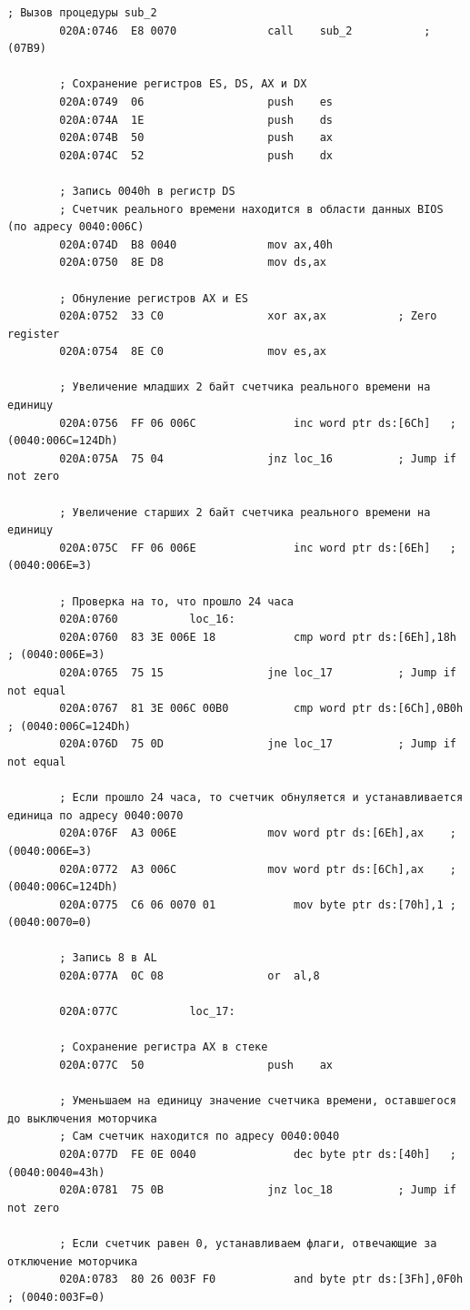 \documentclass[14pt, a4paper]{article}
\begin{document}
	\begin{lstlisting}[style={asm}]
		; Вызов процедуры sub_2
		020A:0746  E8 0070				call	sub_2			; (07B9)
		
		; Сохранение регистров ES, DS, AX и DX
		020A:0749  06					push	es
		020A:074A  1E					push	ds
		020A:074B  50					push	ax
		020A:074C  52					push	dx
		
		; Запись 0040h в регистр DS
		; Cчетчик реального времени находится в области данных BIOS (по адресу 0040:006C)
		020A:074D  B8 0040				mov	ax,40h
		020A:0750  8E D8				mov	ds,ax
		
		; Обнуление регистров AX и ES
		020A:0752  33 C0				xor	ax,ax			; Zero register
		020A:0754  8E C0				mov	es,ax
		
		; Увеличение младших 2 байт счетчика реального времени на единицу
		020A:0756  FF 06 006C				inc	word ptr ds:[6Ch]	; (0040:006C=124Dh)
		020A:075A  75 04				jnz	loc_16			; Jump if not zero
		
		; Увеличение старших 2 байт счетчика реального времени на единицу
		020A:075C  FF 06 006E				inc	word ptr ds:[6Eh]	; (0040:006E=3)
		
		; Проверка на то, что прошло 24 часа
		020A:0760			loc_16:
		020A:0760  83 3E 006E 18			cmp	word ptr ds:[6Eh],18h	; (0040:006E=3)
		020A:0765  75 15				jne	loc_17			; Jump if not equal
		020A:0767  81 3E 006C 00B0			cmp	word ptr ds:[6Ch],0B0h	; (0040:006C=124Dh)
		020A:076D  75 0D				jne	loc_17			; Jump if not equal
		
		; Если прошло 24 часа, то счетчик обнуляется и устанавливается единица по адресу 0040:0070
		020A:076F  A3 006E				mov	word ptr ds:[6Eh],ax	; (0040:006E=3)
		020A:0772  A3 006C				mov	word ptr ds:[6Ch],ax	; (0040:006C=124Dh)
		020A:0775  C6 06 0070 01			mov	byte ptr ds:[70h],1	; (0040:0070=0)
		
		; Запись 8 в AL
		020A:077A  0C 08				or	al,8
		
		020A:077C			loc_17:
		
		; Сохранение регистра AX в стеке
		020A:077C  50					push	ax
		
		; Уменьшаем на единицу значение счетчика времени, оставшегося до выключения моторчика
		; Сам счетчик находится по адресу 0040:0040
		020A:077D  FE 0E 0040				dec	byte ptr ds:[40h]	; (0040:0040=43h)
		020A:0781  75 0B				jnz	loc_18			; Jump if not zero
		
		; Если счетчик равен 0, устанавливаем флаги, отвечающие за отключение моторчика
		020A:0783  80 26 003F F0			and	byte ptr ds:[3Fh],0F0h	; (0040:003F=0)
		

\end{lstlisting}
\end{document}
